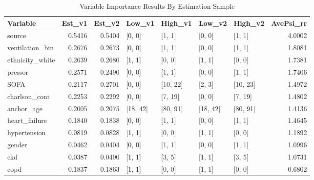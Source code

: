 \begin{table}[ht]
\centering
\caption{Variable Importance Results By Estimation Sample} 
\label{byFold}
\begin{tabular}{lrrllllr}
  \hline
Variable & Est\_v1 & Est\_v2 & Low\_v1 & High\_v1 & Low\_v2 & High\_v2 & AvePsi\_rr \\ 
  \hline
source & 0.5416 & 0.5404 & [0, 0] & [1, 1] & [0, 0] & [1, 1] & 4.0002 \\ 
  ventilation\_bin & 0.2676 & 0.2673 & [0, 0] & [1, 1] & [0, 0] & [1, 1] & 1.8081 \\ 
  ethnicity\_white & 0.2639 & 0.2680 & [1, 1] & [0, 0] & [1, 1] & [0, 0] & 1.7381 \\ 
  pressor & 0.2571 & 0.2490 & [0, 0] & [1, 1] & [0, 0] & [1, 1] & 1.7406 \\ 
  SOFA & 0.2117 & 0.2701 & [0, 0] & [10, 22] & [2, 3] & [10, 23] & 1.4972 \\ 
  charlson\_cont & 0.2253 & 0.2292 & [0, 0] & [7, 19] & [0, 0] & [7, 19] & 1.4802 \\ 
  anchor\_age & 0.2005 & 0.2075 & [18, 42] & [80, 91] & [18, 42] & [80, 91] & 1.4136 \\ 
  heart\_failure & 0.1840 & 0.1838 & [0, 0] & [1, 1] & [0, 0] & [1, 1] & 1.4645 \\ 
  hypertension & 0.0819 & 0.0828 & [1, 1] & [0, 0] & [1, 1] & [0, 0] & 1.1892 \\ 
  gender & 0.0462 & 0.0404 & [0, 0] & [1, 1] & [0, 0] & [1, 1] & 1.0996 \\ 
  ckd & 0.0387 & 0.0490 & [1, 1] & [3, 5] & [1, 1] & [3, 5] & 1.0731 \\ 
  copd & -0.1837 & -0.1863 & [1, 1] & [0, 0] & [1, 1] & [0, 0] & 0.6802 \\ 
   \hline
\end{tabular}
\end{table}

